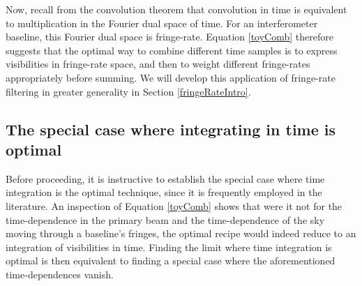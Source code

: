 \documentclass[twocolumn,apj,numberedappendix]{emulateapj}
\begin{document}
Now, recall from the convolution theorem that convolution in time is equivalent
to multiplication in the Fourier dual space of time.  For an interferometer
baseline, this Fourier dual space is fringe-rate.  Equation \eqref{toyComb}
therefore suggests that the optimal way to combine different time samples is to
express visibilities in fringe-rate space, and then to weight different
fringe-rates appropriately before summing.  We will develop this application of
fringe-rate filtering in greater generality in Section \ref{fringeRateIntro}.


\subsection{The special case where integrating in time is optimal}

Before proceeding, it is instructive to establish the special case where time
integration is the optimal technique, since it is frequently employed in the
literature.  An inspection of Equation \eqref{toyComb} shows that were it not
for the time-dependence in the primary beam and the time-dependence of the sky
moving through a baseline's fringes, the optimal recipe would indeed reduce to
an integration of visibilities in time.  Finding the limit where time
integration is optimal is then equivalent to finding a special case where the
aforementioned time-dependences vanish.
\end{document}

